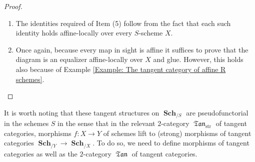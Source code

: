 \documentclass{amsart}
\theoremstyle{definition}
\DeclareMathOperator{\fTan}{\mathfrak{Tan}}
\DeclareMathOperator{\Sch}{\mathbf{Sch}}
\numberwithin{equation}{subsection}
\begin{document}
\begin{proof}
\begin{enumerate}
	\item The identities required of Item (5) follow from the fact that each such identity holds affine-locally over every $S$-scheme $X$.
	\item Once again, because every map in sight is affine it suffices to prove that the diagram is an equalizer affine-locally over $X$ and glue. However, this holds also because of Example \ref{Example: The tangent category of affine R schemes}.
\end{enumerate}
\end{proof}

It is worth noting that these tangent structures on $\Sch_{/S}$ are pseudofunctorial in the schemes $S$ in the sense that in the relevant $2$-category $\fTan_{\operatorname{str}}$ of tangent categories, morphisms $f:X \to Y$ of schemes lift to (strong) morphisms of tangent categories $\Sch_{/Y} \to \Sch_{/X}$. To do so, we need to define morphisms of tangent categories as well as the $2$-category $\fTan$ of tangent categories.
\end{document}
